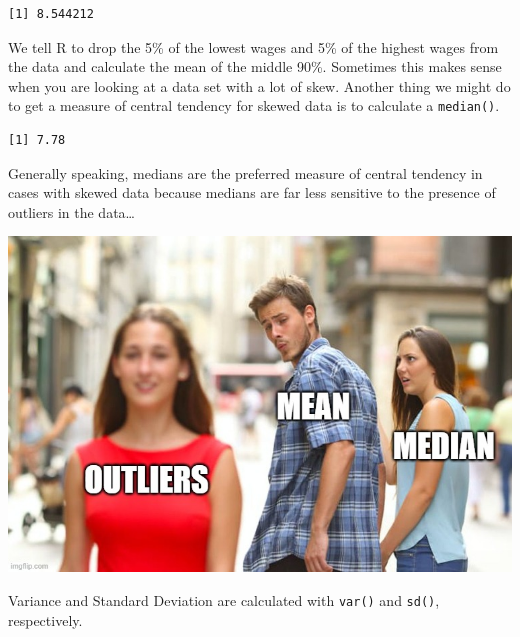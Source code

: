\documentclass[
  letterpaper,
]{book}
\newenvironment{Shaded}{\begin{snugshade}}{\end{snugshade}}
\newcommand{\FunctionTok}[1]{\textcolor[rgb]{0.28,0.35,0.67}{#1}}
\newcommand{\NormalTok}[1]{\textcolor[rgb]{0.00,0.23,0.31}{#1}}
\newcommand{\SpecialCharTok}[1]{\textcolor[rgb]{0.37,0.37,0.37}{#1}}
\begin{document}
\begin{verbatim}
[1] 8.544212
\end{verbatim}

We tell R to drop the 5\% of the lowest wages and 5\% of the highest
wages from the data and calculate the mean of the middle 90\%. Sometimes
this makes sense when you are looking at a data set with a lot of skew.
Another thing we might do to get a measure of central tendency for
skewed data is to calculate a \texttt{median()}.

\begin{Shaded}
\end{Shaded}

\begin{verbatim}
[1] 7.78
\end{verbatim}

Generally speaking, medians are the preferred measure of central
tendency in cases with skewed data because medians are far less
sensitive to the presence of outliers in the data\ldots{}

\begin{center}
\includegraphics[width=0.75\linewidth,height=\textheight,keepaspectratio]{images/meanoutlier.jpg}
\end{center}

Variance and Standard Deviation are calculated with \texttt{var()} and
\texttt{sd()}, respectively.

\begin{Shaded}
\end{Shaded}
\end{document}
